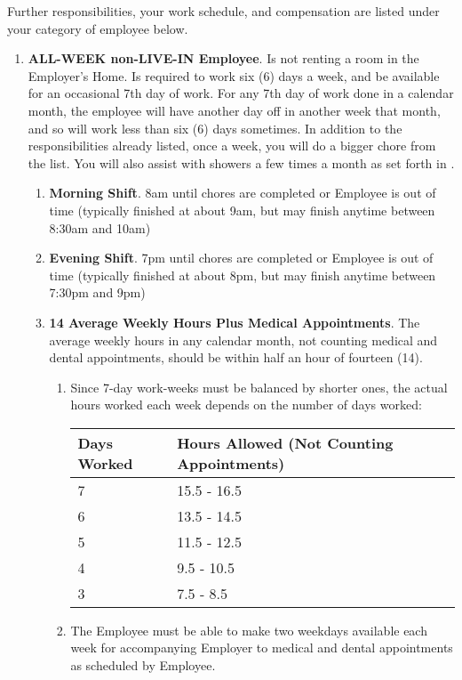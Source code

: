 \documentclass[]{article}
\newcommand{\sw}{.15\textwidth}
\newcommand{\allweek}{ALL-WEEK non-LIVE-IN Employee}
\begin{document}
Further responsibilities, your work schedule, and compensation are listed under your category of employee below.
\begin{enumerate}
	\item \textbf{\allweek{}}. \label{allweek}
		Is not renting a room in the Employer's Home. Is required to work six (6) days a week, and be available for an occasional 7th day of work. For any 7th day of work done in a calendar month, the employee will have another day off in another week that month, and so will work less than six (6) days sometimes. In addition to the responsibilities already listed, once a week, you will do a bigger chore from the \bigchores{} list. You will also assist with showers a few times a month as set forth in \shower{}. 
		\begin{enumerate}
			\item \textbf{Morning Shift}. 8am until chores are completed or Employee is out of time (typically finished at about 9am, but may finish anytime between 8:30am and 10am)
			\item \textbf{Evening Shift}. 7pm until chores are completed or Employee is out of time (typically finished at about 8pm, but may finish anytime between 7:30pm and 9pm)
			\item \textbf{14 Average Weekly Hours Plus Medical Appointments}. The average weekly hours in any calendar month, not counting medical and dental appointments, should be within half an hour of fourteen (14). 
				\begin{enumerate}
					\item Since 7-day work-weeks must be balanced by shorter ones, the actual hours worked each week depends on the number of days worked:\\
						\noindent\begin{tabular}{|p{\sw}|p{\sw}|}
							\hline
							\rowcolor{medgray}
							Days Worked & Hours Allowed (Not Counting Appointments) \\ \hline
							7 & 15.5 - 16.5 \\ \hline
							6 & 13.5 - 14.5 \\ \hline
							5 & 11.5 - 12.5 \\ \hline
							4 & 9.5 - 10.5 \\ \hline
							3 & 7.5 - 8.5 \\
							\hline
						\end{tabular}
					\item The Employee must be able to make two weekdays available each week for accompanying Employer to medical and dental appointments as scheduled by Employee.

\end{enumerate}
\end{enumerate}
\end{enumerate}
\end{document}
